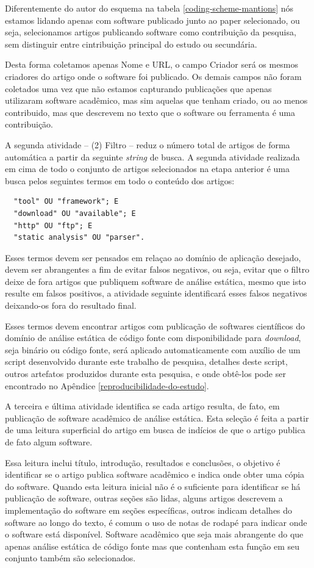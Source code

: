 Diferentemente do autor do esquema na tabela \ref{coding-scheme-mantions} nós
estamos lidando apenas com software publicado junto ao paper selecionado, ou seja,
selecionamos artigos publicando software como contribuição da pesquisa, sem distinguir
entre cintribuição principal do estudo ou secundária.

Desta forma coletamos apenas Nome e URL, o campo Criador será os mesmos
criadores do artigo onde o software foi publicado. Os demais campos não foram coletados uma
vez que não estamos capturando publicações que apenas utilizaram software acadêmico, mas
sim aquelas que tenham criado, ou ao menos contribuido, mas que descrevem
no texto que o software ou ferramenta é uma contribuição.

A segunda atividade -- (2) Filtro -- reduz o número total de artigos de forma
automática a partir da seguinte {\it string} de busca.  A segunda atividade
realizada em cima de todo o conjunto de artigos selecionados na etapa anterior
é uma busca pelos seguintes termos em todo o conteúdo dos artigos:

\begin{verbatim}
  "tool" OU "framework"; E
  "download" OU "available"; E
  "http" OU "ftp"; E
  "static analysis" OU "parser".
\end{verbatim}

Esses termos devem ser pensados em relaçao ao domínio de aplicação
desejado, devem ser abrangentes a fim de evitar falsos negativos, ou seja,
evitar que o filtro deixe de fora artigos que publiquem software de análise
estática, mesmo que isto resulte em falsos positivos, a atividade seguinte
identificará esses falsos negativos deixando-os fora do resultado final.

Esses termos devem encontrar artigos com publicação de softwares
científicos do domínio de análise estática de código fonte com
disponibilidade para {\it download}, seja binário ou código fonte, será
aplicado automaticamente com auxílio de um script desenvolvido durante este
trabalho de pesquisa, detalhes deste script, outros artefatos produzidos
durante esta pesquisa, e onde obtê-los pode ser encontrado no Apêndice
\ref{reproducibilidade-do-estudo}.

A terceira e última atividade identifica se cada
artigo resulta, de fato, em publicação de software acadêmico de análise
estática. Esta seleção é feita a partir de uma leitura superficial do
artigo em busca de indícios de que o artigo publica de fato algum software.

Essa leitura inclui título, introdução, resultados e conclusões, o objetivo
é identificar se o artigo publica software acadêmico e indica onde obter
uma cópia do software. Quando esta leitura inicial não é o suficiente para
identificar se há publicação de software, outras seções são lidas, alguns
artigos descrevem a implementação do software em seções específicas, outros
indicam detalhes do software ao longo do texto, é comum o uso de
notas de rodapé para indicar onde o software está disponível. Software
acadêmico que seja mais abrangente do que apenas análise estática de
código fonte mas que contenham esta função em seu conjunto também são
selecionados.

